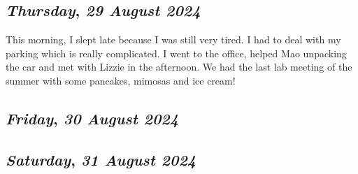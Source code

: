 \def\day{\textit{29 August 2024}}
\def\weekday{\textit{Thursday}}
\subsection*{\weekday, \day}
This morning, I slept late because I was still very tired. I had to deal with my parking which is really complicated. I went to the office, helped Mao unpacking the car and met with Lizzie in the afternoon. We had the last lab meeting of the summer with some pancakes, mimosas and ice cream!

\def\day{\textit{30 August 2024}}
\def\weekday{\textit{Friday}}
\subsection*{\weekday, \day}

\def\day{\textit{31 August 2024}}
\def\weekday{\textit{Saturday}}
\subsection*{\weekday, \day}
